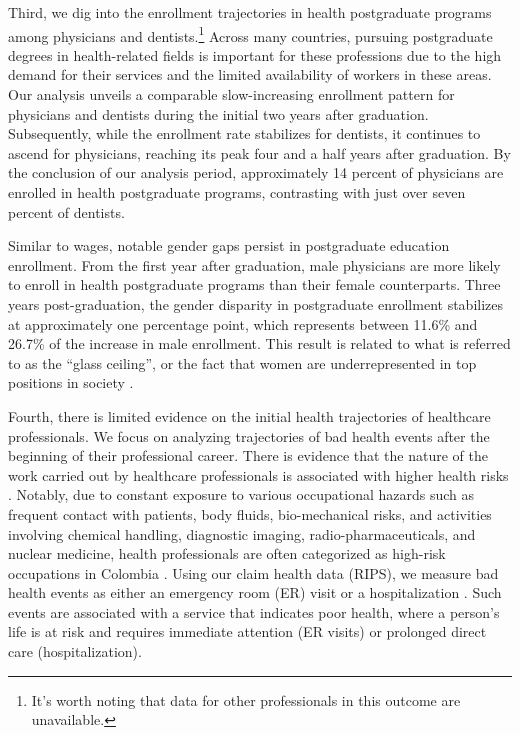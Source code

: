 \documentclass[12pt, a4paper]{article}
\begin{document}
Third, we dig into the enrollment trajectories in health postgraduate programs among physicians and dentists.\footnote{It's worth noting that data for other professionals in this outcome are unavailable.} Across many countries, pursuing postgraduate degrees in health-related fields is important for these professions due to the high demand for their services and the limited availability of workers in these areas. Our analysis unveils a comparable slow-increasing enrollment pattern for physicians and dentists during the initial two years after graduation. Subsequently, while the enrollment rate stabilizes for dentists, it continues to ascend for physicians, reaching its peak four and a half years after graduation. By the conclusion of our analysis period, approximately 14 percent of physicians are enrolled in health postgraduate programs, contrasting with just over seven percent of dentists.

Similar to wages, notable gender gaps persist in postgraduate education enrollment. From the first year after graduation, male physicians are more likely to enroll in health postgraduate programs than their female counterparts. Three years post-graduation, the gender disparity in postgraduate enrollment stabilizes at approximately one percentage point, which represents between 11.6\% and 26.7\% of the increase in male enrollment. This result is related to what is referred to as the “glass ceiling”, or the fact that women are underrepresented in top positions in society \citep{goldin2014grand}. 

Fourth, there is limited evidence on the initial health trajectories of healthcare professionals. We focus on analyzing trajectories of bad health events after the beginning of their professional career. There is evidence that the nature of the work carried out by healthcare professionals is associated with higher health risks \citep{mohanty2019health,kobo2023causes}. 
Notably, due to constant exposure to various occupational hazards such as frequent contact with patients, body fluids, bio-mechanical risks, and activities involving chemical handling, diagnostic imaging, radio-pharmaceuticals, and nuclear medicine, health professionals are often categorized as high-risk occupations in Colombia \citep{Ministeriodetrabajoyseguridadsocial}. Using our claim health data (RIPS), we measure bad health events as either an emergency room (ER) visit or a hospitalization \citep{hansagi2001frequent}. Such events are associated with a service that indicates poor health, where a person's life is at risk and requires immediate attention (ER visits) or prolonged direct care (hospitalization). 
\end{document}
